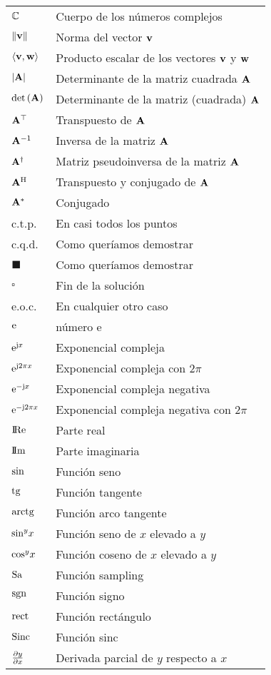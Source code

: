\begin{longtable}{p{3cm}p{8.5cm}}
$\mathbb{C}$ & Cuerpo de los números complejos\\
$\left\| \mathbf{v} \right\|$ & Norma del vector $\mathbf{v}$ \\
$\left\langle {\mathbf{v}, \mathbf{w}} \right\rangle$ & Producto escalar de los vectores $\mathbf{v}$ y $\mathbf{w}$\\
$\left| {\mathbf{A}} \right|$ &Determinante de la matriz cuadrada $\mathbf{A}$\\
$\textrm{det}\left( {\mathbf{A}} \right)$ &Determinante de la matriz (cuadrada) $\mathbf{A}$\\
$\mathbf{A}^\top$ & Transpuesto de $\mathbf{A}$\\
$\mathbf{A}^{-1}$ & Inversa de la matriz $\mathbf{A}$\\
$\mathbf{A}{^\dagger}$ & Matriz pseudoinversa de la matriz $\mathbf{A}$\\
$\mathbf{A}^\mathrm{H}$ & Transpuesto  y conjugado de $\mathbf{A}$\\
$\mathbf{A}^*$ & Conjugado\\
c.t.p. & En casi todos los puntos\\
c.q.d. & Como queríamos demostrar\\
\ensuremath{\blacksquare}& Como queríamos demostrar\\
\ensuremath{\square}& Fin de la solución\\
e.o.c. & En cualquier otro caso\\
$\mathrm{e}$ & número e\\
$\mathrm{e}^{\textrm{j}{x}}$ & Exponencial compleja\\
$\mathrm{e}^{\textrm{j}2\pi{x}}$ & Exponencial compleja con $2\pi$\\
$\mathrm{e}^{-\textrm{j}{x}}$ & Exponencial compleja negativa\\
$\mathrm{e}^{-\textrm{j}2\pi{x}}$ & Exponencial compleja negativa con $2\pi$\\
$\mbox{$\mathrm{I\!Re}$}$ & Parte real\\
$\mbox{$\mathrm{I\!Im}$}$ & Parte imaginaria\\
$\operatorname{sin}$ & Función seno \\
$\operatorname{tg}$ & Función tangente \\
$\operatorname{arctg}$ & Función arco tangente \\
$\sin^{y}\!x$ & Función seno de $x$  elevado a $y$\\
$\cos^{y}\!x$ & Función coseno de $x$  elevado a $y$\\
$\operatorname{Sa}$ & Función sampling \\
$\operatorname{sgn}$ & Función signo \\
$\operatorname{rect}$ & Función rectángulo \\
$\operatorname{Sinc}$ & Función sinc\\
$\frac{\partial y}{\partial x} $ & Derivada parcial de $y$ respecto a $x$\\

\end{longtable}
